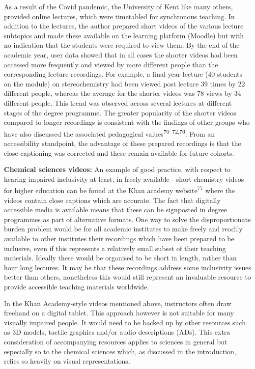\documentclass[11.5pt]{sig-alternate} %
\begin{document}
\begin{large}
As a result of the Covid pandemic, the University of Kent like many others, provided online lectures, which were timetabled for synchronous teaching. In addition to the lectures, the author prepared short videos of the various lecture subtopics and made these available on the learning platform (Moodle) but with no indication that the students were required to view them. By the end of the academic year, user data showed that in all cases the shorter videos had been accessed more frequently and viewed by more different people than the corresponding lecture recordings. For example, a final year lecture (40 students on the module) on stereochemistry had been viewed post lecture 39 times by 22 different people, whereas the average for the shorter videos was 78 views by 34 different people. This trend was observed across several lectures at different stages of the degree programme. The greater popularity of the shorter videos compared to longer recordings is consistent with the findings of other groups who have also discussed the associated pedagogical values\textsuperscript{70–72,76}. From an accessibility standpoint, the advantage of these prepared recordings is that the close captioning was corrected and these remain available for future cohorts. 

\textbf{Chemical sciences videos:} An example of good practice, with respect to hearing impaired inclusivity at least, in freely available - short chemistry videos for higher education can be found at the Khan academy website\textsuperscript{77} where the videos contain close captions which are accurate. The fact that digitally accessible media is available means that these can be signposted in degree programmes as part of alternative formats. One way to solve the disproportionate burden problem would be for all academic institutes to make freely and readily available to other institutes their recordings which have been prepared to be inclusive, even if this represents a relatively small subset of their teaching materials. Ideally these would be organised to be short in length, rather than hour long lectures. It may be that these recordings address some inclusivity issues better than others, nonetheless this would still represent an invaluable resource to provide accessible teaching materials worldwide. 

In the Khan Academy-style videos mentioned above, instructors often draw freehand on a digital tablet. This approach however is not suitable for many visually impaired people. It would need to be backed up by other resources such as 3D models, tactile graphics and/or audio descriptions (ADs). This extra consideration of accompanying resources applies to sciences in general but especially so to the chemical sciences which, as discussed in the introduction, relies so heavily on visual representations. 


\end{large}
\end{document}
